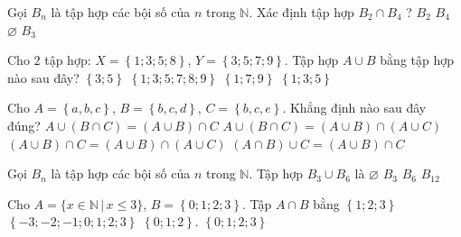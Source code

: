 \begin{ex}%
	Gọi $B_n$ là tập hợp các bội số của $ n$ trong $\mathbb N$. Xác định tập hợp $B_2\cap{B_4}$ ?
	\choice
	{$B_2$}
	{\True $B_4$}
	{$\varnothing$}
	{$B_3$}
\end{ex}

\begin{ex}%
	Cho $2$ tập hợp: $ X=\left\{1;3;5;8\right\}$, $Y=\left\{3;5;7;9\right\}$. Tập hợp $ A\cup B$ bằng tập hợp nào sau đây?
	\choice
	{$\left\{3;5\right\}$}
	{\True $\left\{1;3;5;7;8;9\right\}$}
	{$\left\{1;7;9\right\}$}
	{$\left\{1;3;5\right\}$}
	\loigiai{
	}
\end{ex}

\begin{ex}%
	Cho $ A=\left\{a, b, c\right\}$, $ B=\left\{b, c, d\right\}$, $ C=\left\{b, c, e\right\}$.
	Khẳng định nào sau đây đúng?
	\choice
	{$ A\cup\left(B\cap C\right)=\left(A\cup B\right)\cap C$}
	{\True $ A\cup\left(B\cap C\right)=\left(A\cup B\right)\cap\left(A\cup C\right)$}
	{$\left(A\cup B\right)\cap C=\left(A\cup B\right)\cap\left(A\cup C\right)$}
	{$\left(A\cap B\right)\cup C=\left(A\cup B\right)\cap C$}
\end{ex}

\begin{ex}%
	Gọi $B_n$ là tập hợp các bội số của $ n$ trong $\mathbb N$. Tập hợp $B_3\cup{B_6}$ là
	\choice
	{$\varnothing$}
	{\True $B_3$}
	{$B_6$}
	{$B_{12}$}
\end{ex}


\begin{ex}%
	Cho $A=\{x\in\mathbb N \,|\, x\leq 3 \}$, $ B=\left\{0;1;2;3\right\}$. Tập $ A\cap B$ bằng
	\choice
	{$\left\{1;2;3\right\}$}
	{$\left\{-3;-2;-1;0;1;2;3\right\}$}
	{$\left\{0;1;2\right\}$.	}
	{\True $\left\{0;1;2;3\right\}$}
\end{ex}




